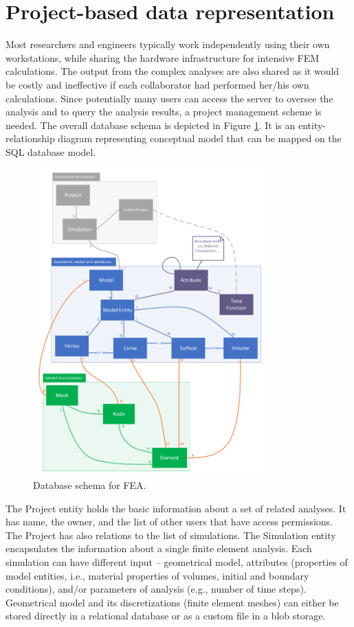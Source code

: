\section{Project-based data representation}
\label{sec:project-db-schema}

Most researchers and engineers typically work independently using their own workstations, while sharing the hardware infrastructure for intensive FEM calculations. The output from the complex analyses are also shared as it would be costly and ineffective if each collaborator had performed her/his own calculations. Since potentially many users can access the server to oversee the analysis and to query the analysis results, a project management scheme is needed. The overall database schema is depicted in Figure \ref{fig:FEA-db-schema}. It is an entity-relationship diagram representing conceptual model that can be mapped on the SQL database model.

\begin{figure}[H]
    \centering
    \includegraphics[width=0.8\textwidth]{figures/chapter-data-management/FEA-database-schema}
    \decoRule
    \caption{Database schema for FEA.}
    \label{fig:FEA-db-schema}
\end{figure}

The Project entity holds the basic information about a set of related analyses. It has name, the owner, and the list of other users that have access permissions. The Project has also relations to the list of simulations. The Simulation entity encapsulates the information about a single finite element analysis. Each simulation can have different input -- geometrical model, attributes (properties of model entities, i.e., material properties of volumes, initial and boundary conditions), and/or parameters of analysis (e.g., number of time steps). Geometrical model and its discretizations (finite element meshes) can either be stored directly in a relational database or as a custom file in a blob storage.


